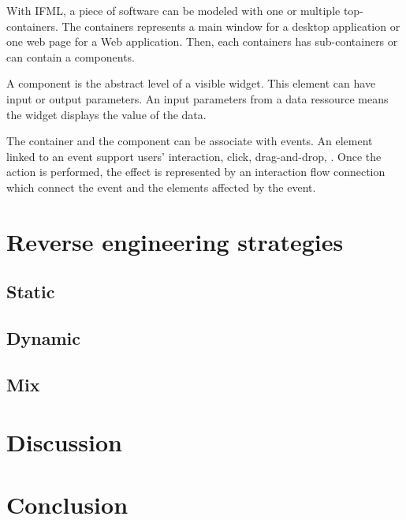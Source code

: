 \documentclass[conference]{IEEEtran}
\begin{document}
With IFML, a piece of software can be modeled with one or multiple top-containers.
The containers represents a main window for a desktop application or one web page for a Web application.
Then, each containers has sub-containers or can contain a components.

A component is the abstract level of a visible widget.
This element can have input or output parameters.
An input parameters from a data ressource means the widget displays the value of the data.

The container and the component can be associate with events.
An element linked to an event support users' interaction, \eg click, drag-and-drop, \etc.
Once the action is performed, the effect is represented by an interaction flow connection which connect the event
    and the elements affected by the event.


\section{Reverse engineering strategies}
\label{sec:reverseEngineering}

\subsection{Static}
\label{sec:reverseStatic}

\subsection{Dynamic}
\label{sec:reverseDynamic}

\subsection{Mix}
\label{sec:reverseMix}

\section{Discussion}
\label{sec:discussion}



\section{Conclusion}
\label{sec:conclusion}
\end{document}

